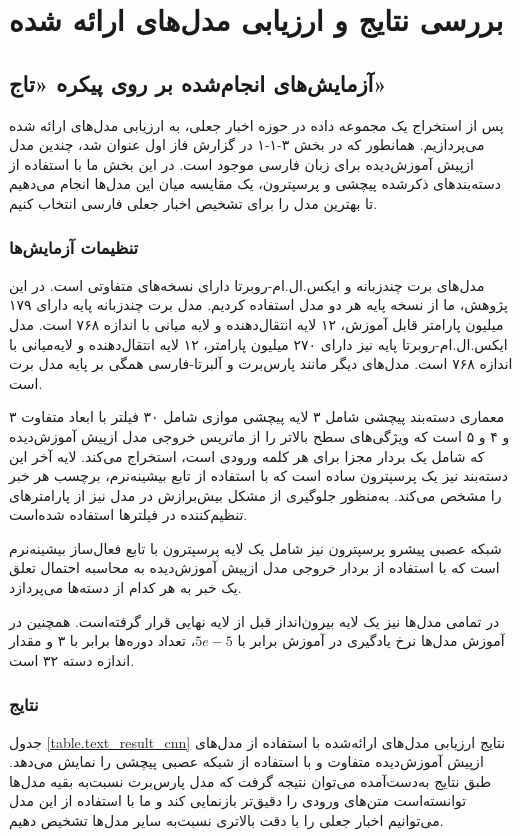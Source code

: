 \chapter{بررسی نتایج و ارزیابی مدل‌های ارائه شده}


\section{آزمایش‌های انجام‌شده بر روی پیکره «تاج»}
پس از استخراج یک مجموعه داده در حوزه اخبار جعلی، به ارزیابی مدل‌های ارائه شده می‌پردازیم. همانطور که در بخش ۳-۱-۱ در گزارش فاز اول عنوان شد، چندین مدل ازپیش آموزش‌دیده برای زبان‌ فارسی موجود است. در این بخش ما با استفاده از دسته‌بند‌های ذکرشده پیچشی و پرسپترون، یک مقایسه میان این مدل‌ها انجام می‌دهیم تا بهترین مدل‌ را برای تشخیص اخبار جعلی فارسی انتخاب کنیم.

\subsection{تنظیمات آزمایش‌ها}
مدل‌های برت چندزبانه و ایکس.ال.ام-روبرتا دارای نسخه‌های متفاوتی است. در این پژوهش، ما از نسخه‌ پایه هر دو مدل استفاده کردیم. مدل برت چند‌زبانه پایه دارای ۱۷۹ میلیون پارامتر قابل آموزش، ۱۲ لایه انتقال‌دهنده و لایه میانی با اندازه ۷۶۸ است. مدل ایکس.ال.ام-روبرتا پایه نیز دارای ۲۷۰ میلیون پارامتر، ۱۲ لایه انتقال‌دهنده و لایه‌میانی با اندازه ۷۶۸ است. مدل‌های دیگر مانند پارس‌برت و آلبرتا-فارسی همگی بر پایه مدل برت است.

معماری دسته‌بند پیچشی شامل ۳ لایه پیچشی موازی شامل ۳۰ فیلتر‌ با ابعاد متفاوت ۳ و ۴ و ۵ است که ویژگی‌های سطح بالاتر را از ماتریس خروجی مدل ازپیش‌ آموزش‌دیده که شامل یک بردار مجزا برای هر کلمه ورودی است، استخراج می‌کند. لایه آخر این دسته‌بند نیز یک پرسپترون ساده است که با استفاده از تابع بیشینه‌نرم، برچسب هر خبر را مشخص می‌کند. به‌منظور جلوگیری از مشکل بیش‌برازش در مدل نیز از پارامتر‌های تنظیم‌کننده در فیلتر‌ها استفاده شده‌است.

شبکه عصبی پیشرو پرسپترون نیز شامل یک لایه پرسپترون با تابع فعال‌ساز بیشینه‌نرم است که با استفاده از بردار خروجی مدل ازپیش آموزش‌دیده به محاسبه احتمال تعلق یک خبر به هر کدام از دسته‌ها می‌پردازد.

در تمامی مدل‌ها نیز یک لایه بیرون‌انداز قبل از لایه‌ نهایی قرار گرفته‌است. همچنین در آموزش مدل‌ها نرخ یادگیری در آموزش برابر با $5e-5$، تعداد دوره‌‌ها برابر با ۳ و مقدار اندازه دسته ۳۲  است.

\subsection{نتایج}
جدول \ref{table.text_result_cnn} نتایج ارزیابی مدل‌های ارائه‌شده با استفاده از مدل‌های ازپیش آموزش‌دیده متفاوت و با استفاده از شبکه عصبی پیچشی را نمایش می‌دهد. طبق نتایج به‌دست‌آمده می‌توان نتیجه گرفت که مدل پارس‌برت نسبت‌به بقیه‌ مدل‌ها توانسته‌است متن‌های ورودی را دقیق‌تر بازنمایی کند و ما با استفاده از این مدل می‌توانیم اخبار جعلی را با دقت بالاتری نسبت‌به سایر مدل‌ها تشخیص دهیم.

